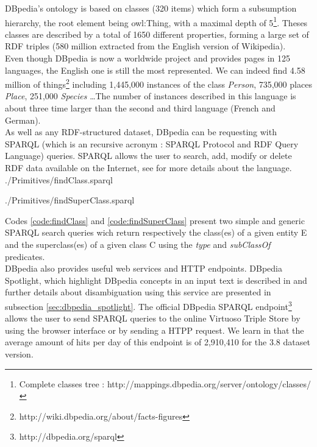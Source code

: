 DBpedia's ontology is based on classes (320 items) which form a subsumption hierarchy, the root element being owl:Thing, with a maximal depth of 5\footnote{Complete classes tree : http://mappings.dbpedia.org/server/ontology/classes/}. Theses classes are described by a total of 1650 different properties, forming a large set of RDF triples (580 million extracted from the English version of Wikipedia).\\

Even though DBpedia is now a worldwide project and provides pages in 125 languages, the English one is still the most represented. We can indeed find 4.58 million of things\footnote{http://wiki.dbpedia.org/about/facts-figures} including 1,445,000 instances of the class \textit{Person}, 735,000 places \textit{Place}, 251,000 \textit{Species} \dots The number of instances described in this language is about three time larger than the second and third language (French and German). \\

As well as any RDF-structured dataset, DBpedia can be requesting with SPARQL (which is an recursive acronym : SPARQL Protocol and RDF Query Language) queries. SPARQL allows the user to search, add, modify or delete RDF data available on the Internet, see \cite{prud2008sparql} for more details about the language. \\


	{./Primitives/findClass.sparql}


	{./Primitives/findSuperClass.sparql}

Codes \ref{code:findClass} and \ref{code:findSuperClass} present two simple and generic SPARQL search queries wich return respectively the class(es) of a given entity E and the superclass(es) of a given class C using the \textit{type} and \textit{subClassOf} predicates.\\

DBpedia also provides useful web services and HTTP endpoints. DBpedia Spotlight, which highlight DBpedia concepts in an input text is described in \cite{mendes2011dbpedia} and further details about disambiguation using this service are presented in subsection \ref{sec:dbpedia_spotlight}. The official DBpedia SPARQL endpoint\footnote{http://dbpedia.org/sparql} allows the user to send SPARQL queries to the online Virtuoso Triple Store by using the browser interface or by sending a HTPP request. We learn in \cite{lehmann2014dbpedia} that the average amount of hits per day of this endpoint is of 2,910,410 for the 3.8 dataset version. \\

